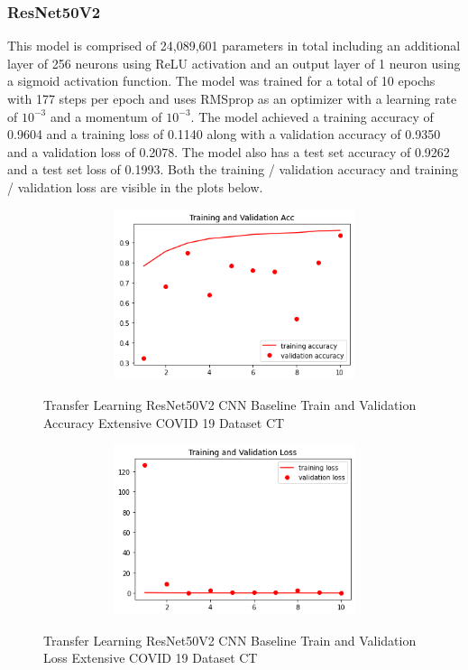 \subsubsection{ResNet50V2}
This model is comprised of 24,089,601 parameters in total including an additional layer of 256 neurons using ReLU activation and an output layer of 1 neuron using a sigmoid activation function.  The model was trained for a total of 10 epochs with 177 steps per epoch and uses RMSprop as an optimizer with a learning rate of $10^{-3}$ and a momentum of $10^{-3}$.  The model achieved a training accuracy of 0.9604 and a training loss of 0.1140 along with a validation accuracy of 0.9350 and a validation loss of 0.2078.  The model also has a test set accuracy of 0.9262 and a test set loss of 0.1993. Both the training / validation accuracy and training / validation loss are visible in the plots below.
 \begin{figure}[H]
    \centering
    \includegraphics[width=1\textwidth,height=5cm,keepaspectratio]{Images/ResNet50V2BaselineTrainingValidationAccuracyExtensiveCT.png}\\
    \caption{Transfer Learning ResNet50V2 CNN Baseline Train and Validation Accuracy Extensive COVID 19 Dataset CT}
    \label{fig:ResNet50V2 CNN Baseline Train and Validation Accuracy Extensive COVID 19 Dataset CT}
\end{figure}
 \begin{figure}[H]
    \centering   \includegraphics[width=1\textwidth,height=5cm,keepaspectratio]{Images/ResNet50V2BaselineTrainingValidationLossExtensiveCT.png}\\
    \caption{Transfer Learning ResNet50V2 CNN Baseline Train and Validation Loss Extensive COVID 19 Dataset CT}
    \label{fig:ResNet50V2 CNN Baseline Train and Validation Loss Extensive COVID 19 Dataset CT}
\end{figure}
